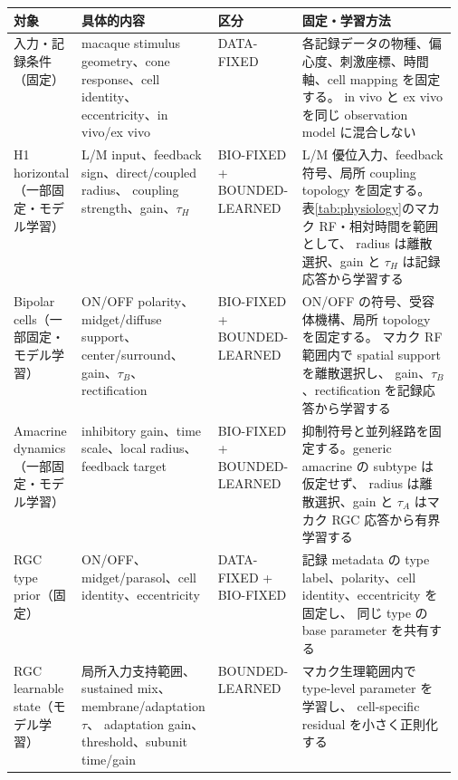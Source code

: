 \documentclass[a4paper,10pt,twocolumn,uplatex,dvipdfmx]{jsarticle}
\renewcommand{\arraystretch}{1.22}
\begin{document}
\scriptsize
\renewcommand{\arraystretch}{1.08}
\setlength{\tabcolsep}{2.5pt}
\begin{tabularx}{0.98\linewidth}{
  >{\raggedright\arraybackslash}p{0.14\linewidth}
  >{\raggedright\arraybackslash}p{0.24\linewidth}
  >{\raggedright\arraybackslash}p{0.19\linewidth}
  Y}
\toprule
\textbf{対象} &
\textbf{具体的内容} &
\textbf{区分} &
\textbf{固定・学習方法} \\
\midrule

入力・記録条件\newline（固定） &
macaque stimulus geometry、cone response、cell identity、
eccentricity、in vivo/ex vivo &
DATA-FIXED &
各記録データの物種、偏心度、刺激座標、時間軸、cell mapping を固定する。
in vivo と ex vivo を同じ observation model に混合しない \\

H1 horizontal\newline（一部固定・モデル学習） &
L/M input、feedback sign、direct/coupled radius、
coupling strength、gain、$\tau_H$ &
BIO-FIXED + BOUNDED-LEARNED &
L/M 優位入力、feedback 符号、局所 coupling topology を固定する。
表\ref{tab:physiology}のマカク RF・相対時間を範囲として、
radius は離散選択、gain と $\tau_H$ は記録応答から学習する \\

Bipolar cells\newline（一部固定・モデル学習） &
ON/OFF polarity、midget/diffuse support、center/surround、
gain、$\tau_B$、rectification &
BIO-FIXED + BOUNDED-LEARNED &
ON/OFF の符号、受容体機構、局所 topology を固定する。
マカク RF 範囲内で spatial support を離散選択し、
gain、$\tau_B$、rectification を記録応答から学習する \\

Amacrine dynamics\newline（一部固定・モデル学習） &
inhibitory gain、time scale、local radius、feedback target &
BIO-FIXED + BOUNDED-LEARNED &
抑制符号と並列経路を固定する。generic amacrine の subtype は仮定せず、
radius は離散選択、gain と $\tau_A$ はマカク RGC 応答から有界学習する \\

RGC type prior\newline（固定） &
ON/OFF、midget/parasol、cell identity、eccentricity &
DATA-FIXED + BIO-FIXED &
記録 metadata の type label、polarity、cell identity、eccentricity を固定し、
同じ type の base parameter を共有する \\

RGC learnable state\newline（モデル学習） &
局所入力支持範囲、sustained mix、membrane/adaptation $\tau$、
adaptation gain、threshold、subunit time/gain &
BOUNDED-LEARNED &
マカク生理範囲内で type-level parameter を学習し、
cell-specific residual を小さく正則化する \\


\end{tabularx}
\end{document}
